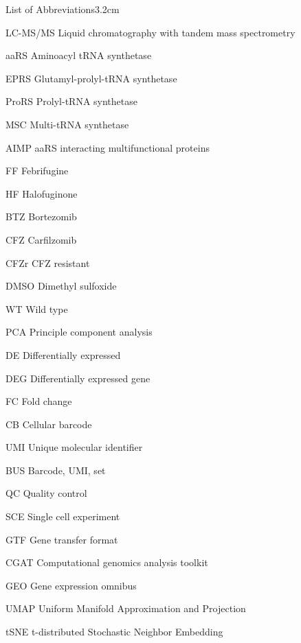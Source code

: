 \begin{mclistof}{List of Abbreviations}{3.2cm}
\item[LC-MS/MS] Liquid chromatography with tandem mass spectrometry

\item[aaRS] Aminoacyl tRNA synthetase

\item[EPRS] Glutamyl-prolyl-tRNA synthetase

\item[ProRS] Prolyl-tRNA synthetase

\item[MSC] Multi-tRNA synthetase

\item[AIMP] aaRS interacting multifunctional proteins

\item[FF] Febrifugine

\item[HF] Halofuginone

\item[BTZ] Bortezomib

\item[CFZ] Carfilzomib

\item[CFZr] CFZ resistant

\item[DMSO] Dimethyl sulfoxide

\item[WT] Wild type

\item[PCA] Principle component analysis

\item[DE] Differentially expressed

\item[DEG] Differentially expressed gene

\item[FC] Fold change

\item[CB] Cellular barcode

\item[UMI] Unique molecular identifier

\item[BUS] Barcode, UMI, set

\item[QC] Quality control

\item[SCE] Single cell experiment

\item[GTF] Gene transfer format

\item[CGAT] Computational genomics analysis toolkit

\item[GEO] Gene expression omnibus

\item[UMAP] Uniform Manifold Approximation and Projection

\item[tSNE] t-distributed Stochastic Neighbor Embedding

\end{mclistof} 
